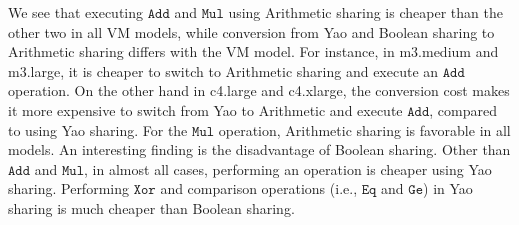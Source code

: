 \documentclass{llncs}
\begin{document}
We see that executing $\mathtt{Add}$ and $\mathtt{Mul}$ using Arithmetic sharing is cheaper than the other two in all VM models, while conversion from Yao and Boolean sharing to Arithmetic sharing differs with the VM model. For instance, in m3.medium and m3.large, it is cheaper to switch to Arithmetic sharing and execute an $\mathtt{Add}$ operation. On the other hand in c4.large and c4.xlarge, the conversion cost makes it more expensive to switch from Yao to Arithmetic and execute $\mathtt{Add}$, compared to using Yao sharing. For the $\mathtt{Mul}$ operation, Arithmetic sharing is favorable in all models. An interesting finding is the disadvantage of Boolean sharing. Other than $\mathtt{Add}$ and $\mathtt{Mul}$, in almost all cases, performing an operation is cheaper using Yao sharing. Performing $\mathtt{Xor}$ and comparison operations (i.e., $\mathtt{Eq}$ and $\mathtt{Ge}$) in Yao sharing is much cheaper than Boolean sharing.
\end{document}
